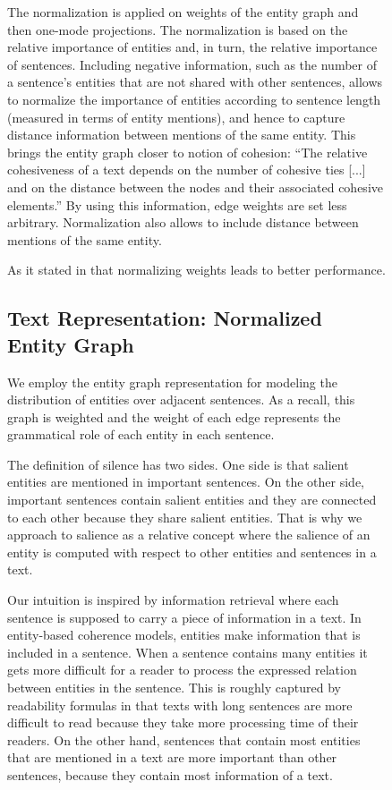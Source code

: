 \begin{figure}[!t]
The normalization is applied on weights of the entity graph and then one-mode projections. 
The normalization is based on the relative importance of entities and, in turn, the relative importance of sentences. 
Including negative information, such as the number of a sentence's entities that are not shared with other sentences, allows to normalize the importance of entities according to sentence length (measured in terms
of entity mentions), and hence to capture distance information between mentions of the same entity.
This brings the entity graph closer to  notion of cohesion: ``The relative cohesiveness of a text depends on the number of cohesive ties [...] and on the distance between the nodes and their associated cohesive elements.” By using this information, edge weights are set less arbitrary. 
Normalization also allows to include distance between mentions of the same entity.  

As it stated in \cite{zhoudengyong07,zweig11} that normalizing weights leads to better performance. 

\subsection{Text Representation: Normalized Entity Graph}
%
We employ the entity graph representation for modeling the distribution of entities over adjacent sentences. 
As a recall, this graph is weighted and the weight of each edge represents the grammatical role of each entity in each sentence.  


The definition of silence has two sides. 
One side is that salient entities are mentioned in important sentences.  
On the other side, important sentences contain salient entities and they are connected to each other because they share salient entities. 
That is why we approach to salience as a relative concept where the salience of an entity is computed with respect to other entities and sentences in a text. 

Our intuition is inspired by information retrieval where each sentence is supposed to carry a piece of information in a text. 
In entity-based coherence models, entities make information that is included in a sentence. 
When a sentence contains many entities it gets more difficult for a reader to process the expressed relation between entities in the sentence. 
This is roughly captured by readability formulas in that texts with long sentences are more difficult to read because they take more processing time of their readers. 
On the other hand, sentences that contain most entities that are mentioned in a text are more important than other sentences, because they contain most information of a text. 


\end{figure}
